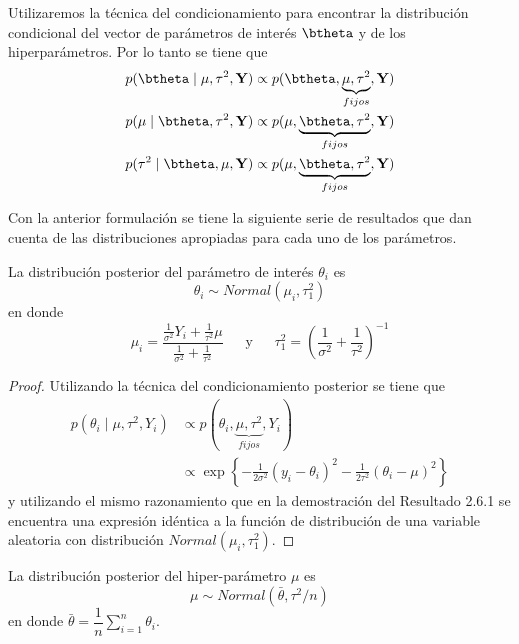 \documentclass[10pt,openright]{book}\usepackage[]{graphicx}\usepackage[]{color}
\begin{document}
Utilizaremos la t\'ecnica del condicionamiento para encontrar la distribuci\'on condicional del vector de par\'ametros de inter\'es $\btheta$ y de los hiperpar\'ametros. Por lo tanto se tiene que
\begin{align*}
p(\btheta \mid \mu,\tau^2,\mathbf{Y})
&\propto p(\btheta,\underbrace{\mu,\tau^2}_{fijos},\mathbf{Y})\\
p(\mu \mid \btheta,\tau^2,\mathbf{Y})
&\propto p(\mu,\underbrace{\btheta,\tau^2}_{fijos},\mathbf{Y}) \\
p(\tau^2 \mid \btheta,\mu,\mathbf{Y})
&\propto p(\mu,\underbrace{\btheta,\tau^2}_{fijos},\mathbf{Y})
\end{align*}

Con la anterior formulaci\'on se tiene la siguiente serie de resultados que dan cuenta de las distribuciones apropiadas para cada uno de los par\'ametros.

\begin{Res}
La distribuci\'on posterior del par\'ametro de inter\'es $\theta_i$ es
\begin{equation*}
\theta_i\sim Normal(\mu_i,\tau_1^2)
\end{equation*}
en donde
\begin{equation*}
\mu_i=\frac{\frac{1}{\sigma^2}Y_i+\frac{1}{\tau^2}\mu}{\frac{1}{\sigma^2}+\frac{1}{\tau^2}}
\ \ \ \ \ \ \ \text{y} \ \ \ \ \ \ \
\tau_1^2=\left(\frac{1}{\sigma^2}+\frac{1}{\tau^2}\right)^{-1}
\end{equation*}
\end{Res}

\begin{proof}
Utilizando la t\'ecnica del condicionamiento posterior se tiene que
\begin{align*}
p(\theta_i \mid \mu,\tau^2,Y_i)
&\propto p(\theta_i,\underbrace{\mu,\tau^2}_{fijos},Y_i)\\
&\propto \exp\left\{-\frac{1}{2\sigma^2}(y_i-\theta_i)^2-\frac{1}{2\tau^2}(\theta_i-\mu)^2\right\}
\end{align*}
y utilizando el mismo razonamiento que en la demostraci\'on del Resultado 2.6.1 se encuentra una expresi\'on id\'entica a la funci\'on de distribuci\'on de una variable aleatoria con distribuci\'on $Normal(\mu_i,\tau_1^2)$.
\end{proof}

\begin{Res}
La distribuci\'on posterior del hiper-par\'ametro $\mu$ es
\begin{equation*}
\mu\sim Normal(\bar{\theta},\tau^2/n)
\end{equation*}
en donde $\bar{\theta}=\dfrac{1}{n}\sum_{i=1}^n\theta_i$.
\end{Res}
\end{document}

